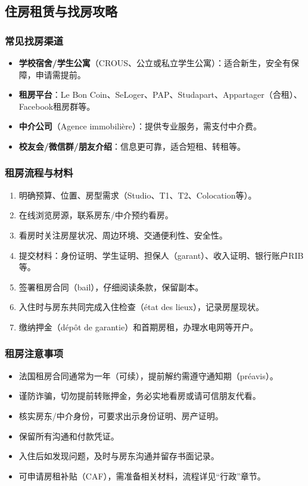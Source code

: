 \subsection{住房租赁与找房攻略}

\subsubsection{常见找房渠道}
\begin{itemize}
    \item \textbf{学校宿舍/学生公寓}（CROUS、公立或私立学生公寓）：适合新生，安全有保障，申请需提前。
    \item \textbf{租房平台}：Le Bon Coin、SeLoger、PAP、Studapart、Appartager（合租）、Facebook租房群等。
    \item \textbf{中介公司}（Agence immobilière）：提供专业服务，需支付中介费。
    \item \textbf{校友会/微信群/朋友介绍}：信息更可靠，适合短租、转租等。
\end{itemize}

\subsubsection{租房流程与材料}
\begin{enumerate}
    \item 明确预算、位置、房型需求（Studio、T1、T2、Colocation等）。
    \item 在线浏览房源，联系房东/中介预约看房。
    \item 看房时关注房屋状况、周边环境、交通便利性、安全性。
    \item 提交材料：身份证明、学生证明、担保人（garant）、收入证明、银行账户RIB等。
    \item 签署租房合同（bail），仔细阅读条款，保留副本。
    \item 入住时与房东共同完成入住检查（état des lieux），记录房屋现状。
    \item 缴纳押金（dépôt de garantie）和首期房租，办理水电网等开户。
\end{enumerate}

\subsubsection{租房注意事项}
\begin{itemize}
    \item 法国租房合同通常为一年（可续），提前解约需遵守通知期（préavis）。
    \item 谨防诈骗，切勿提前转账押金，务必实地看房或请可信朋友代看。
    \item 核实房东/中介身份，可要求出示身份证明、房产证明。
    \item 保留所有沟通和付款凭证。
    \item 入住后如发现问题，及时与房东沟通并留存书面记录。
    \item 可申请房租补贴（CAF），需准备相关材料，流程详见“行政”章节。
\end{itemize}

